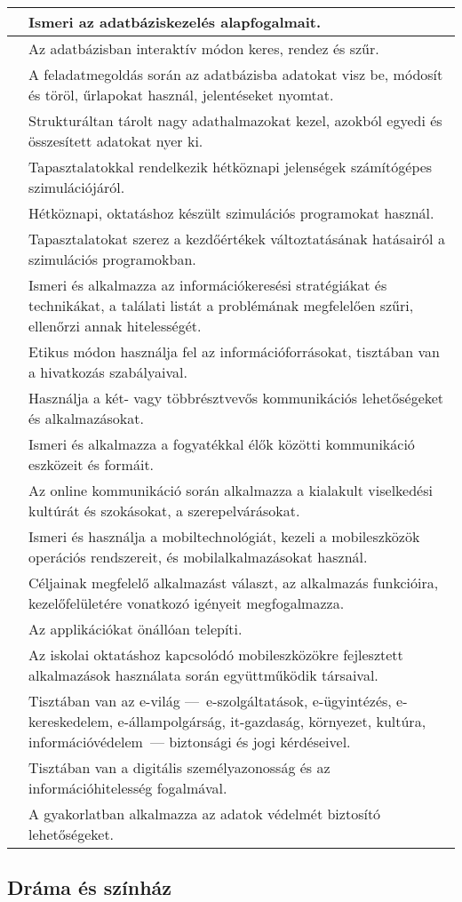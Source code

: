 \begin{longtable}[]{p{\evflength}@{\strut}>{\begin{minipage}{\columnlength}\strut}l<{\strut\end{minipage}}}
\tabularnewline
\hline
&
  Ismeri az adatbáziskezelés alapfogalmait.
\tabularnewline
\hline
&
  Az adatbázisban interaktív módon keres, rendez és szűr.
\tabularnewline
\hline
&
  A feladatmegoldás során az adatbázisba adatokat visz be, módosít és
  töröl, űrlapokat használ, jelentéseket nyomtat.
\tabularnewline
\hline
&
  Strukturáltan tárolt nagy adathalmazokat kezel, azokból egyedi és
  összesített adatokat nyer ki.
\tabularnewline
\hline
&
  Tapasztalatokkal rendelkezik hétköznapi jelenségek számítógépes
  szimulációjáról.
\tabularnewline
\hline
&
  Hétköznapi, oktatáshoz készült szimulációs programokat használ.
\tabularnewline
\hline
&
  Tapasztalatokat szerez a kezdőértékek változtatásának hatásairól a
  szimulációs programokban.
\tabularnewline
\hline
&
  Ismeri és alkalmazza az információkeresési stratégiákat és
  technikákat, a találati listát a problémának megfelelően szűri,
  ellenőrzi annak hitelességét.
\tabularnewline
\hline
&
  Etikus módon használja fel az információforrásokat, tisztában van a
  hivatkozás szabályaival.
\tabularnewline
\hline
&
  Használja a két- vagy többrésztvevős kommunikációs lehetőségeket és
  alkalmazásokat.
\tabularnewline
\hline
&
  Ismeri és alkalmazza a fogyatékkal élők közötti kommunikáció eszközeit
  és formáit.
\tabularnewline
\hline
&
  Az online kommunikáció során alkalmazza a kialakult viselkedési
  kultúrát és szokásokat, a szerepelvárásokat.
\tabularnewline
\hline
&
  Ismeri és használja a mobiltechnológiát, kezeli a mobileszközök
  operációs rendszereit, és mobilalkalmazásokat használ.
\tabularnewline
\hline
&
  Céljainak megfelelő alkalmazást választ, az alkalmazás funkcióira,
  kezelőfelületére vonatkozó igényeit megfogalmazza.
\tabularnewline
\hline
&
  Az applikációkat önállóan telepíti.
\tabularnewline
\hline
&
  Az iskolai oktatáshoz kapcsolódó mobileszközökre fejlesztett
  alkalmazások használata során együttműködik társaival.
\tabularnewline
\hline
&
  Tisztában van az e-világ ---~e-szolgáltatások, e-ügyintézés,
  e-kereskedelem, e-állampolgárság, it-gazdaság, környezet, kultúra,
  információvédelem~--- biztonsági és jogi kérdéseivel.
\tabularnewline
\hline
&
  Tisztában van a digitális személyazonosság és az információhitelesség
  fogalmával.
\tabularnewline
\hline
&
  A gyakorlatban alkalmazza az adatok védelmét biztosító lehetőségeket.
\tabularnewline
\hline
\end{longtable}

\hypertarget{drama-es-szinhaz}{%
\subsection{Dráma és színház}\label{drama-es-szinhaz}}

